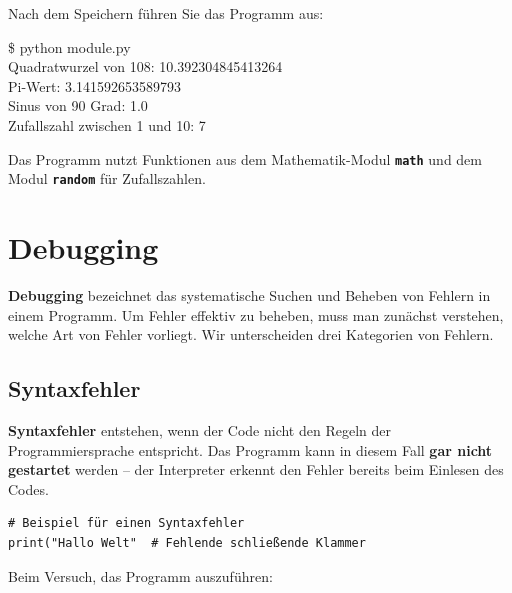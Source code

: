 \documentclass[ngerman,11pt]{article}
\begin{document}
\noindent Nach dem Speichern führen Sie das Programm aus:

\begin{tcolorbox}[colback=gray!15, fontupper=\ttfamily, boxrule=0.5pt,
    left=3mm, right=3mm, top=2mm, bottom=2mm]
\$ python module.py\\
Quadratwurzel von 108: 10.392304845413264\\
Pi-Wert: 3.141592653589793\\
Sinus von 90 Grad: 1.0\\
Zufallszahl zwischen 1 und 10: 7
\end{tcolorbox}

\noindent Das Programm nutzt Funktionen aus dem Mathematik-Modul \textbf{\texttt{math}} und dem Modul \textbf{\texttt{random}} für Zufallszahlen.

\section{Debugging}

\textbf{Debugging} bezeichnet das systematische Suchen und Beheben von Fehlern in einem Programm. Um Fehler effektiv zu beheben, muss man zunächst verstehen, welche Art von Fehler vorliegt. Wir unterscheiden drei Kategorien von Fehlern.

\subsection{Syntaxfehler}

\textbf{Syntaxfehler} entstehen, wenn der Code nicht den Regeln der Programmiersprache entspricht. Das Programm kann in diesem Fall \textbf{gar nicht gestartet} werden -- der Interpreter erkennt den Fehler bereits beim Einlesen des Codes.

\begin{lstlisting}[caption=fehler\_syntax.py]
# Beispiel für einen Syntaxfehler
print("Hallo Welt"  # Fehlende schließende Klammer
\end{lstlisting}

\noindent Beim Versuch, das Programm auszuführen:

\end{document}

